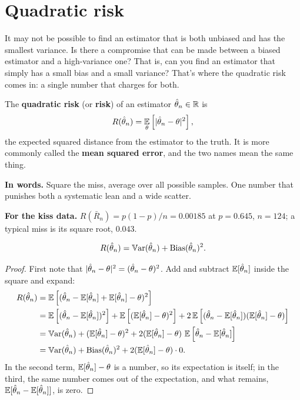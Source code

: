 \section{Quadratic risk}
\label{sec:est-risk}

It may not be possible to find an estimator that is both unbiased and has the smallest variance.
Is there a compromise that can be made between a biased estimator and a high-variance one?
That is, can you find an estimator that simply has a small bias and a small variance?
That's where the quadratic risk comes in: a single number that charges for both.

\begin{definition}
\label{def:risk}
The \textbf{quadratic risk} (or \textbf{risk}) of an estimator $\hat{\theta}_n \in \mathbb{R}$ is
\[
R(\hat{\theta}_n) = \operatorname*{\mathbb{E}}_\theta \left[ \lvert\hat{\theta}_n - \theta\rvert^2 \right],
\]
the expected squared distance from the estimator to the truth.
It is more commonly called the \textbf{mean squared error}, and the two names mean the same thing.
\end{definition}

\begin{inwords}
\textbf{In words.} Square the miss, average over all possible samples. One number that punishes both a systematic lean and a wide scatter.
\par\smallskip
\textbf{For the kiss data.} $R(\bar{R}_n) = p(1-p)/n = 0.00185$ at $p = 0.645$, $n = 124$; a typical miss is its square root, $0.043$.
\end{inwords}

\begin{theorem}
\label{thm:bias-variance}
\[
R(\hat{\theta}_n) = \operatorname*{\mathbb{V}\text{ar}}(\hat{\theta}_n) + \text{Bias}(\hat{\theta}_n)^2.
\]
\end{theorem}

\begin{proof}
First note that $\lvert\hat{\theta}_n - \theta\rvert^2 = (\hat{\theta}_n - \theta)^2$.
Add and subtract $\operatorname*{\mathbb{E}}[\hat{\theta}_n]$ inside the square and expand:
\begin{align*}
R(\hat{\theta}_n) &= \operatorname*{\mathbb{E}}\left[ ( \hat{\theta}_n - \operatorname*{\mathbb{E}}[\hat{\theta}_n] + \operatorname*{\mathbb{E}}[\hat{\theta}_n] - \theta)^2 \right] \\
	&= \operatorname*{\mathbb{E}} \left[ (\hat{\theta}_n  - \operatorname*{\mathbb{E}}[\hat{\theta}_n])^2 \right] + \operatorname*{\mathbb{E}} \left[ (\operatorname*{\mathbb{E}}[\hat{\theta}_n] - \theta)^2 \right] + 2 \operatorname*{\mathbb{E}}\left[(\hat{\theta}_n - \operatorname*{\mathbb{E}}[\hat{\theta}_n]) (\operatorname*{\mathbb{E}}[\hat{\theta}_n] - \theta) \right] \\
	&= \operatorname*{\mathbb{V}\text{ar}}(\hat{\theta}_n) + (\operatorname*{\mathbb{E}}[\hat{\theta}_n] - \theta)^2 + 2 (\operatorname*{\mathbb{E}}[\hat{\theta}_n] - \theta) \, \operatorname*{\mathbb{E}}\left[\hat{\theta}_n - \operatorname*{\mathbb{E}}[\hat{\theta}_n] \right] \\
	&= \operatorname*{\mathbb{V}\text{ar}}(\hat{\theta}_n) + \text{Bias}(\hat{\theta}_n)^2 + 2 (\operatorname*{\mathbb{E}}[\hat{\theta}_n] - \theta) \cdot 0.
\end{align*}
In the second term, $\operatorname*{\mathbb{E}}[\hat{\theta}_n] - \theta$ is a number, so its expectation is itself; in the third, the same number comes out of the expectation, and what remains, $\operatorname*{\mathbb{E}}[\hat{\theta}_n - \operatorname*{\mathbb{E}}[\hat{\theta}_n]]$, is zero.
\end{proof}

